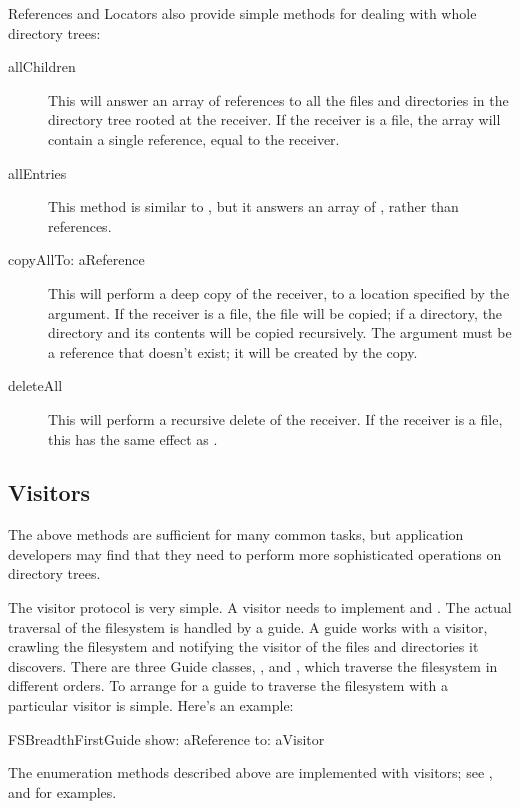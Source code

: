 \documentclass[a4paper,10pt,twoside]{book}
\begin{document}
References and Locators also provide simple methods for dealing with whole directory trees:

\begin{description}
\item[allChildren]

This will answer an array of references to all the files and directories in the directory tree rooted at the receiver. If the receiver is a file, the array will contain a single reference, equal to the receiver.

\item[allEntries]
This method is similar to , but it answers an array of , rather than references.

\item[copyAllTo: aReference]

This will perform a deep copy of the receiver, to a location specified by the argument. If the receiver is a file, the file will be copied; if a directory, the directory and its contents will be copied recursively. The argument must be a reference that doesn't exist; it will be created by the copy.

\item[deleteAll]

This will perform a recursive delete of the receiver. If the receiver is a file, this has the same effect as .
\end{description}

\subsection{Visitors}

The above methods are sufficient for many common tasks, but application developers may find that they need to perform more sophisticated operations on directory trees.

The visitor protocol is very simple. A visitor needs to implement  and . The actual traversal of the filesystem is handled by a guide. A guide works with a visitor, crawling the filesystem and notifying the visitor of the files and directories it discovers. There are three Guide classes, ,  and  , which traverse the filesystem in different orders. To arrange for a guide to traverse the filesystem with a particular visitor is simple. Here's an example:

\begin{code}{}
    FSBreadthFirstGuide show: aReference to: aVisitor
\end{code}	

The enumeration methods described above are implemented with visitors; see ,  and  for examples.



\ifx\wholebook\relax\else
   
   
\end{document}
